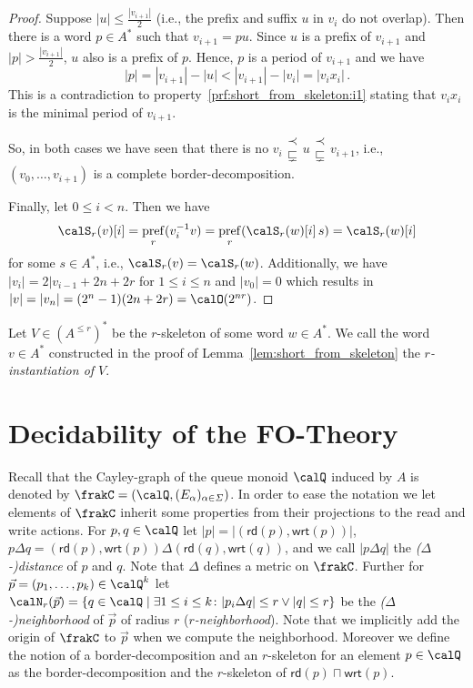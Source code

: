 \documentclass[a4paper,numberwithinsect,USenglish]{lipics-v2018}
\theoremstyle{plain}
\theoremstyle{remark}
\DeclareMathOperator{\pref}{pref}
\newcommand{\rd}[1]{\mathsf{rd}(#1)}
\newcommand{\wrt}[1]{\mathsf{wrt}(#1)}
\newcommand{\Qx}{\calQ}
\newcommand{\inv}[1]{#1^{-1}}
\newcommand{\presuf}{\mathbin{\substack{{\prec}\\{\sqsubsetneq}}}}
\renewcommand{\Sigma}{\varSigma}
\begin{document}
\begin{proof}
	Suppose $|u|\leq\frac{|v_{i+1}|}{2}$ (i.e., the prefix and suffix $u$ in $v_i$ do not overlap). Then there is a word $p\in A^*$ such that $v_{i+1}=pu$. Since $u$ is a prefix of $v_{i+1}$ and $|p|>\frac{|v_{i+1}|}{2}$, $u$ also is a prefix of $p$. Hence, $p$ is a period of $v_{i+1}$ and we have
	\[|p|=|v_{i+1}|-|u|<|v_{i+1}|-|v_i|=|v_ix_i|\,.\]
	This is a contradiction to property~\ref{prf:short_from_skeleton:i1} stating that $v_ix_i$ is the minimal period of $v_{i+1}$.
	
	So, in both cases we have seen that there is no $v_i\presuf u\presuf v_{i+1}$, i.e., $(v_0,\dots,v_{i+1})$ is a complete border-decomposition.
	
	Finally, let $0\leq i<n$. Then we have
	\[\calS_r(v)[i]=\pref_r(\inv{v_i}v)=\pref_r(\calS_r(w)[i]\,s)=\calS_r(w)[i]\]
	for some $s\in A^*$, i.e., $\calS_r(v)=\calS_r(w)$. Additionally, we have $|v_i|=2|v_{i-1}+2n+2r$ for $1\leq i\leq n$ and $|v_0|=0$ which results in $|v|=|v_n|=(2^n-1)(2n+2r)=\calO(2^{nr})$.
\end{proof}

Let $V\in (A^{\leq r})^*$ be the $r$-skeleton of some word $w\in A^*$. We call the word $v\in A^*$ constructed in the proof of Lemma~\ref{lem:short_from_skeleton} the \emph{$r$-instantiation of $V$}.


\section{Decidability of the FO-Theory}\label{sec:decidability}
Recall that the Cayley-graph of the queue monoid $\Qx$ induced by $A$ is denoted by $\frakC=(\Qx,(E_\alpha)_{\alpha\in\Sigma})$.
In order to ease the notation we let elements of $\frakC$ inherit some properties from their projections to the read and write actions. 
For $p,q\in \Qx$ let $|p| = |(\rd{p}, \wrt{p})|$, $p\Delta q = (\rd{p}, \wrt{p})\Delta (\rd{q}, \wrt{q})$, and we call $|p\Delta q|$ the \emph{($\Delta$-)distance} of $p$ and $q$. Note that $\Delta$ defines a metric on $\frakC$. Further for $\vec{p} = (p_1,\ldots,p_k)\in \Qx^k$ let 
$\calN_r(\vec{p}) = \{ q\in \Qx \mid \exists 1\leq i \leq k\colon |p_i\Delta q| \leq r \vee |q| \leq r \}$ be the \emph{($\Delta$-)neighborhood} of $\vec{p}$ of radius $r$ (\emph{$r$-neighborhood}). Note that we implicitly add the origin
of $\frakC$ to $\vec{p}$ when we compute the neighborhood. Moreover we define the notion of a border-decomposition and an $r$-skeleton for an element $p\in\Qx$ as the border-decomposition and the $r$-skeleton of $\rd{p} \sqcap \wrt{p}$.
\end{document}
